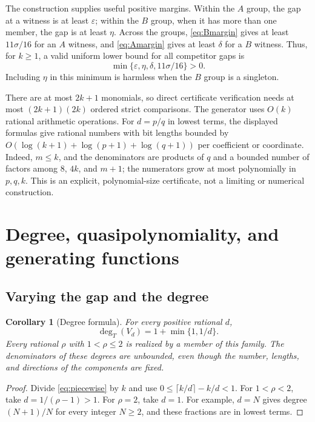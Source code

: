 \documentclass[11pt,a4paper]{article}
\numberwithin{equation}{section}
\newtheorem{corollary}[theorem]{Corollary}
\theoremstyle{definition}
\theoremstyle{remark}
\newcommand{\degT}{\operatorname{deg}_{T}}
\begin{document}
The construction supplies useful positive margins. Within the $A$ group,
the gap at a witness is at least $\varepsilon$; within the $B$ group, when it
has more than one member, the gap is at least $\eta$. Across the groups,
\eqref{eq:Bmargin} gives at least $11\sigma/16$ for an $A$ witness, and
\eqref{eq:Amargin} gives at least $\delta$ for a $B$ witness. Thus, for $k\geq1$,
a valid uniform lower bound for all competitor gaps is
\begin{equation}
\label{eq:margin}
\min\{\varepsilon,\eta,\delta,11\sigma/16\}>0.
\end{equation}
Including $\eta$ in this minimum is harmless when the $B$ group is a singleton.

There are at most $2k+1$ monomials, so direct certificate verification needs
at most $(2k+1)(2k)$ ordered strict comparisons. The generator uses $O(k)$
rational arithmetic operations. For $d=p/q$ in lowest terms, the displayed
formulas give rational numbers with bit lengths bounded by
$O(\log(k+1)+\log(p+1)+\log(q+1))$ per coefficient or coordinate. Indeed,
$m\leq k$, and the denominators are products of $q$ and a bounded number of
factors among $8$, $4k$, and $m+1$; the numerators grow at most polynomially
in $p,q,k$. This is an explicit, polynomial-size certificate, not a limiting
or numerical construction.

\section{Degree, quasipolynomiality, and generating functions}
\label{sec:consequences}

\subsection{Varying the gap and the degree}

\begin{corollary}[Degree formula]
\label{cor:degree}
For every positive rational $d$,
\begin{equation}
\label{eq:degreeformula}
\degT(V_d)=1+\min\{1,1/d\}.
\end{equation}
Every rational $\rho$ with $1<\rho\leq2$ is realized by a member of this
family. The denominators of these degrees are unbounded, even though the
number, lengths, and directions of the components are fixed.
\end{corollary}

\begin{proof}
Divide \eqref{eq:piecewise} by $k$ and use
$0\leq\lceil k/d\rceil-k/d<1$. For $1<\rho<2$, take
$d=1/(\rho-1)>1$. For $\rho=2$, take $d=1$.
For example, $d=N$ gives degree $(N+1)/N$ for every integer $N\geq2$, and
these fractions are in lowest terms.
\end{proof}
\end{document}
